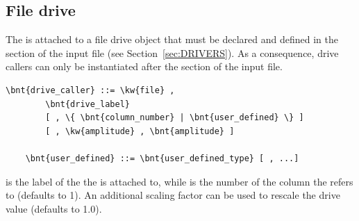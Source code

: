 \subsection{File drive}\label{sec:DriveCaller:FILE}
The  is attached to a file drive object that must be declared
and defined in the  section 
of the input file (see Section~\ref{sec:DRIVERS}).
As a consequence,  drive callers can only be instantiated
after the  section
of the input file.
\begin{Verbatim}[commandchars=\\\{\}]
    \bnt{drive_caller} ::= \kw{file} ,
        \bnt{drive_label}
        [ , \{ \bnt{column_number} | \bnt{user_defined} \} ]
        [ , \kw{amplitude} , \bnt{amplitude} ]

    \bnt{user_defined} ::= \bnt{user_defined_type} [ , ...]
\end{Verbatim}
 is the label of the  
the  is attached to, while
 is the number of the column the 
refers to (defaults to 1).
An additional scaling factor  can be used to rescale
the drive value (defaults to 1.0).

